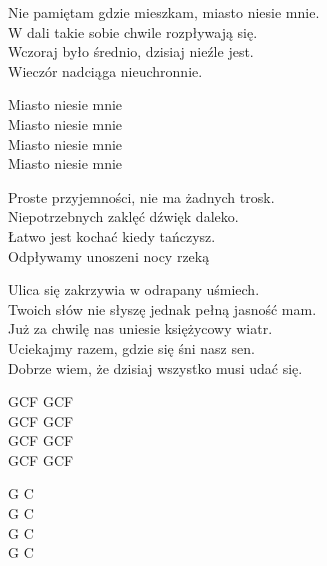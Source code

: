 \begin{text}
    Nie pamiętam gdzie mieszkam, miasto niesie mnie.\\
    W dali takie sobie chwile rozpływają się.\\
    Wczoraj było średnio, dzisiaj nieźle jest.\\
    Wieczór nadciąga nieuchronnie.

    \vin Miasto niesie mnie\\
    \vin Miasto niesie mnie\\
    \vin Miasto niesie mnie\\
    \vin Miasto niesie mnie

    Proste przyjemności, nie ma żadnych trosk.\\
    Niepotrzebnych zaklęć dźwięk daleko.\\
    Łatwo jest kochać kiedy tańczysz.\\
    Odpływamy unoszeni nocy rzeką

    Ulica się zakrzywia w odrapany uśmiech.\\
    Twoich słów nie słyszę jednak pełną jasność mam.\\
    Już za chwilę nas uniesie księżycowy wiatr.\\
    Uciekajmy razem, gdzie się śni nasz sen.\\
    Dobrze wiem, że dzisiaj wszystko musi udać się.
\end{text}
\begin{chord}
    GCF GCF\\
    GCF GCF\\
    GCF GCF\\
    GCF GCF

    G C\\
    G C\\
    G C\\
    G C
\end{chord}